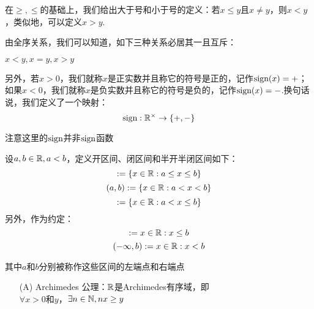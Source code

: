 在$\geq,\leq$的基础上，我们给出大于号和小于号的定义：若$x\leq y$且$x\neq y$，则$x<y$，类似地，可以定义$x>y$.

由全序关系，我们可以知道，如下三种关系必居其一且互斥：

$x<y,x=y,x>y$

另外，若$x>0$，我们就称$x$是正实数并且称它的符号是正的，记作$\text{sign}(x)=+$；如果$x<0$，我们就称$x$是负实数并且称它的符号是负的，记作$\text{sign}(x)=-$.换句话说，我们定义了一个映射：
\[\text{sign}:\mathbb{R}^{\times} \rightarrow\{+,-\}\]

\begin{remark}
    注意这里的$\text{sign}$并非$\text{sign}$函数
\end{remark}

\begin{definition}[区间]
    设$a,b\in\mathbb{R},a<b$，定义开区间、闭区间和半开半闭区间如下：
    \begin{equation*}
        [a,b] :=\{x\in\RR : a\leq x\leq b\}
    \end{equation*}
    \begin{equation*}
        (a,b) :=\{x\in\mathbb{R} : a< x< b\}
    \end{equation*}
    \begin{equation*}
        [a,b) := \{x\in\RR : a\leq x< b\}
    \end{equation*}
    \begin{equation*}
        (a,b] :=\{x\in\RR : a< x\leq b\}
    \end{equation*}
    另外，作为约定：
    \begin{equation*}
        [a,+\infty):={x\in\RR:x\geq a}
    \end{equation*}
    \begin{equation*}
        (a,+\infty):={x\in\RR:x< a}
    \end{equation*}
    \begin{equation*}
        (-\infty,b]:={x\in\RR:x\leq b}
    \end{equation*}
    \begin{equation*}
        (-\infty,b):={x\in\mathbb{R}:x< b}
    \end{equation*}

    其中$a$和$b$分别被称作这些区间的左端点和右端点
\end{definition}

\begin{itemize}
    \item[(A)] Archimedes 公理：$\mathbb{R}$是Archimedes有序域，即\\
    $\forall x>0$和$y$，$\exists n\in\mathbb{N}, nx\geq y$
\end{itemize}

